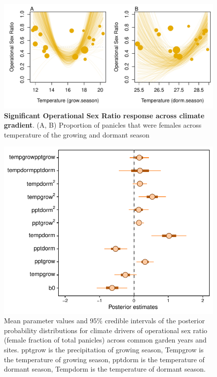 \documentclass[12pt]{article}\usepackage[]{graphicx}\usepackage[dvipsnames]{xcolor}
\begin{document}
\begin{figure}[H]
	\begin{center}
		\includegraphics[width=0.95\linewidth]{Figures/gardens_OSR.pdf}
		\caption{\textbf{Significant Operational Sex Ratio response across climate gradient}.
			(A, B) Proportion of panicles that were females across  temperature of the growing and dormant season }
		\label{Sup:gardens_OSR}
	\end{center}
\end{figure}

\begin{figure}[H]
	\begin{center}
		\includegraphics[width=0.70\linewidth]{Figures/Posterior_ORS.pdf}
		\caption{Mean parameter values and 95\% credible intervals of the posterior probability distributions for climate drivers of operational sex ratio (female fraction of total panicles) across common garden years and sites. 
		pptgrow is  the precipitation of growing season,
		Tempgrow is the temperature of growing season,
		pptdorm is the temperature of dormant season,
		Tempdorm is the temperature of dormant season.}
		\label{Sup:posterior_OSR}
	\end{center}
\end{figure}
\end{document}
